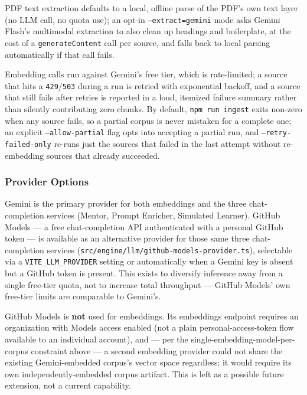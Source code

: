\documentclass[11pt,letterpaper]{article}
\newcommand{\code}[1]{\texttt{\small #1}}
\begin{document}
PDF text extraction defaults to a local, offline parse of the PDF's own text layer (no LLM call, no quota use); an opt-in \code{--extract=gemini} mode asks Gemini Flash's multimodal extraction to also clean up headings and boilerplate, at the cost of a \code{generateContent} call per source, and falls back to local parsing automatically if that call fails.

Embedding calls run against Gemini's free tier, which is rate-limited; a source that hits a \code{429}/\code{503} during a run is retried with exponential backoff, and a source that still fails after retries is reported in a loud, itemized failure summary rather than silently contributing zero chunks. By default, \code{npm run ingest} exits non-zero when any source fails, so a partial corpus is never mistaken for a complete one; an explicit \code{--allow-partial} flag opts into accepting a partial run, and \code{--retry-failed-only} re-runs just the sources that failed in the last attempt without re-embedding sources that already succeeded.

\subsubsection{Provider Options}
\label{sec:provider-options}

Gemini is the primary provider for both embeddings and the three chat-completion services (Mentor, Prompt Enricher, Simulated Learner). GitHub Models --- a free chat-completion API authenticated with a personal GitHub token --- is available as an alternative provider for those same three chat-completion services (\code{src/engine/llm/github-models-provider.ts}), selectable via a \code{VITE\_LLM\_PROVIDER} setting or automatically when a Gemini key is absent but a GitHub token is present. This exists to diversify inference away from a single free-tier quota, not to increase total throughput --- GitHub Models' own free-tier limits are comparable to Gemini's.

GitHub Models is \textbf{not} used for embeddings. Its embeddings endpoint requires an organization with Models access enabled (not a plain personal-access-token flow available to an individual account), and --- per the single-embedding-model-per-corpus constraint above --- a second embedding provider could not share the existing Gemini-embedded corpus's vector space regardless; it would require its own independently-embedded corpus artifact. This is left as a possible future extension, not a current capability.
\end{document}
